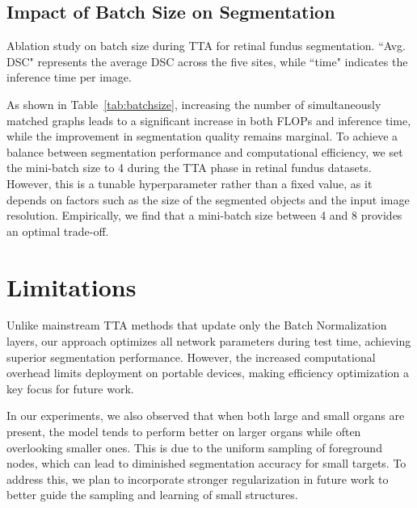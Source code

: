 \subsection{Impact of Batch Size on Segmentation}
\begin{table}[h!]
\centering
  \caption{Ablation study on batch size during TTA for retinal fundus segmentation. ``Avg. DSC" represents the average DSC across the five sites, while ``time" indicates the inference time per image.}
  \begin{adjustbox}{width=0.669\linewidth}
    
  \end{adjustbox}
  \label{tab:batchsize}
\end{table}

As shown in Table~\ref{tab:batchsize}, increasing the number of simultaneously matched graphs leads to a significant increase in both FLOPs and inference time, while the improvement in segmentation quality remains marginal. To achieve a balance between segmentation performance and computational efficiency, we set the mini-batch size to 4 during the TTA phase in retinal fundus datasets. However, this is a tunable hyperparameter rather than a fixed value, as it depends on factors such as the size of the segmented objects and the input image resolution. Empirically, we find that a mini-batch size between 4 and 8 provides an optimal trade-off.

\section{Limitations}
Unlike mainstream TTA methods that update only the Batch Normalization layers, our approach optimizes all network parameters during test time, achieving superior segmentation performance. However, the increased computational overhead limits deployment on portable devices, making efficiency optimization a key focus for future work.

In our experiments, we also observed that when both large and small organs are present, the model tends to perform better on larger organs while often overlooking smaller ones. This is due to the uniform sampling of foreground nodes, which can lead to diminished segmentation accuracy for small targets. To address this, we plan to incorporate stronger regularization in future work to better guide the sampling and learning of small structures.

